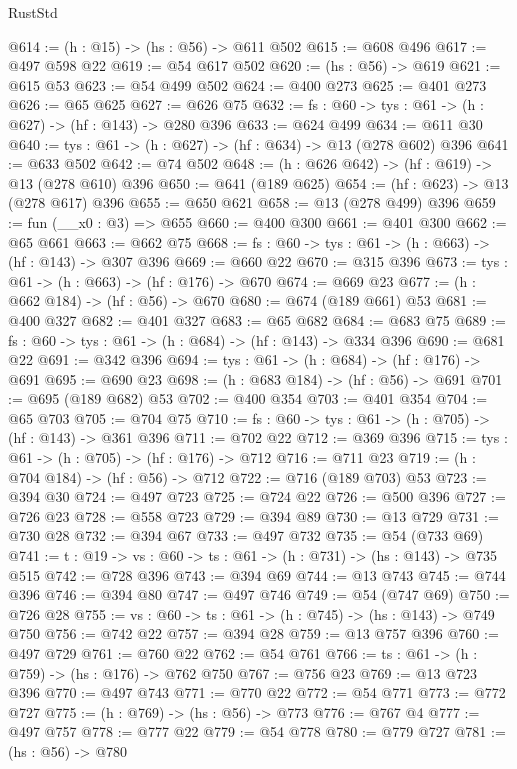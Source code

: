 \begin{lexlean}{RustStd}
\begin{coremodule}
{\begin{coremodule}
{{{{{{{{{{{{@614 := (h : @15) -> (hs : @56) -> @611 @502
@615 := @608 @496
@617 := @497 @598 @22
@619 := @54 @617 @502
@620 := (hs : @56) -> @619
@621 := @615 @53
@623 := @54 @499 @502
@624 := @400 @273
@625 := @401 @273
@626 := @65 @625
@627 := @626 @75
@632 := {fs : @60} -> {tys : @61} -> (h : @627) -> (hf : @143) -> @280 @396
@633 := @624 @499
@634 := @611 @30
@640 := {tys : @61} -> (h : @627) -> (hf : @634) -> @13 (@278 @602) @396
@641 := @633 @502
@642 := @74 @502
@648 := (h : @626 @642) -> (hf : @619) -> @13 (@278 @610) @396
@650 := @641 (@189 @625)
@654 := (hf : @623) -> @13 (@278 @617) @396
@655 := @650 @621
@658 := @13 (@278 @499) @396
@659 := fun (__x0 : @3) => @655
@660 := @400 @300
@661 := @401 @300
@662 := @65 @661
@663 := @662 @75
@668 := {fs : @60} -> {tys : @61} -> (h : @663) -> (hf : @143) -> @307 @396
@669 := @660 @22
@670 := @315 @396
@673 := {tys : @61} -> (h : @663) -> (hf : @176) -> @670
@674 := @669 @23
@677 := (h : @662 @184) -> (hf : @56) -> @670
@680 := @674 (@189 @661) @53
@681 := @400 @327
@682 := @401 @327
@683 := @65 @682
@684 := @683 @75
@689 := {fs : @60} -> {tys : @61} -> (h : @684) -> (hf : @143) -> @334 @396
@690 := @681 @22
@691 := @342 @396
@694 := {tys : @61} -> (h : @684) -> (hf : @176) -> @691
@695 := @690 @23
@698 := (h : @683 @184) -> (hf : @56) -> @691
@701 := @695 (@189 @682) @53
@702 := @400 @354
@703 := @401 @354
@704 := @65 @703
@705 := @704 @75
@710 := {fs : @60} -> {tys : @61} -> (h : @705) -> (hf : @143) -> @361 @396
@711 := @702 @22
@712 := @369 @396
@715 := {tys : @61} -> (h : @705) -> (hf : @176) -> @712
@716 := @711 @23
@719 := (h : @704 @184) -> (hf : @56) -> @712
@722 := @716 (@189 @703) @53
@723 := @394 @30
@724 := @497 @723
@725 := @724 @22
@726 := @500 @396
@727 := @726 @23
@728 := @558 @723
@729 := @394 @89
@730 := @13 @729
@731 := @730 @28
@732 := @394 @67
@733 := @497 @732
@735 := @54 (@733 @69)
@741 := {t : @19} -> {vs : @60} -> {ts : @61} -> (h : @731) -> (hs : @143) -> @735 @515
@742 := @728 @396
@743 := @394 @69
@744 := @13 @743
@745 := @744 @396
@746 := @394 @80
@747 := @497 @746
@749 := @54 (@747 @69)
@750 := @726 @28
@755 := {vs : @60} -> {ts : @61} -> (h : @745) -> (hs : @143) -> @749 @750
@756 := @742 @22
@757 := @394 @28
@759 := @13 @757 @396
@760 := @497 @729
@761 := @760 @22
@762 := @54 @761
@766 := {ts : @61} -> (h : @759) -> (hs : @176) -> @762 @750
@767 := @756 @23
@769 := @13 @723 @396
@770 := @497 @743
@771 := @770 @22
@772 := @54 @771
@773 := @772 @727
@775 := (h : @769) -> (hs : @56) -> @773
@776 := @767 @4
@777 := @497 @757
@778 := @777 @22
@779 := @54 @778
@780 := @779 @727
@781 := (hs : @56) -> @780
}}}}}}}}}}}}
\end{coremodule}}
\end{coremodule}
\end{lexlean}
